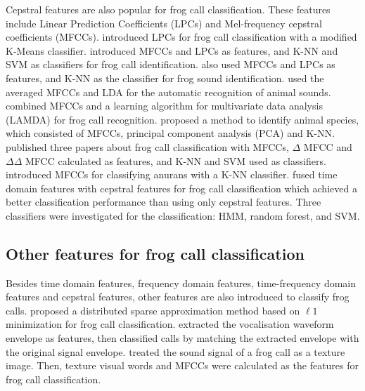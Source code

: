 Cepstral features are also popular for frog call classification. These features include Linear Prediction Coefficients (LPCs) and Mel-frequency cepstral coefficients (MFCCs). 
\cite{colombia2009frogs} introduced LPCs for frog call classification with a modified K-Means classifier. \cite{jaafarcomparative} introduced MFCCs and LPCs as features, and K-NN and SVM as classifiers for frog call identification. \cite{yuan2012frog} also used MFCCs and LPCs as features, and K-NN as the classifier for frog sound identification.
\cite{lee2006automatic} used the averaged MFCCs and LDA for the automatic recognition of animal sounds. \cite{bedoya2014automatic} combined MFCCs and a learning algorithm for multivariate data analysis (LAMDA) for frog call recognition. \cite{vaca2010using} proposed a method to identify animal species, which consisted of MFCCs, principal component analysis (PCA) and K-NN. \cite{jaafar2013, jaafar2013mfcc, tanintelligent2014} published three papers about frog call classification with MFCCs, $\Delta$ MFCC and $\Delta \Delta$ MFCC calculated as features, and K-NN and SVM used as classifiers. \cite{feature2012Colona} introduced MFCCs for classifying anurans with a K-NN classifier. \cite{Noda2016100} fused time domain features with cepstral features for frog call classification which achieved a better classification performance than using only cepstral features. Three classifiers were investigated for the classification: HMM, random forest, and SVM.


\subsection{Other features for frog call classification}
Besides time domain features, frequency domain features, time-frequency domain features and cepstral features, other features are also introduced to classify frog calls.
\cite{wei2012distributed} proposed a distributed sparse approximation method based on $\ell 1$ minimization for frog call classification. \cite{dang2008lightweight} extracted the vocalisation waveform envelope as features, then classified calls by matching the extracted envelope with the original signal envelope. \cite{kular2015classifying} treated the sound signal of a frog call as a texture image. Then, texture visual words and MFCCs were calculated as the features for frog call classification. 




